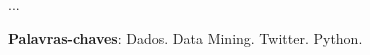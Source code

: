 \begin{resumo}[RESUMO]	
...


 \vspace{\onelineskip}
    
 \noindent
 \textbf{Palavras-chaves}: Dados. Data Mining. Twitter. Python.
\end{resumo}
